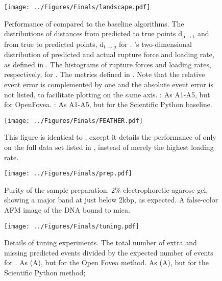 \begin{figure}[htpb]
\caption[Algorithm Performance]{\noindent{}\pStartF Performance of \name{} compared to the baseline algorithms.  The distributions of distances from predicted to true points d$_{\mathrm{p}\rightarrow\mathrm{t}}$ and from true to predicted points, d$_{\mathrm{t}\rightarrow\mathrm{p}}$ for \name{}.  \name{}'s two-dimensional distribution of predicted and actual rupture force and loading rate, as defined in .  The histograms of rupture forces and loading rates, respectively, for \name{}.   The metrics defined in . Note that the relative event error is complemented by one and the absolute event error is not listed, to facilitate plotting on the same axis. : As A1-A5, but for OpenFovea. : As A1-A5, but for the Scientific Python baseline. \pEndF }
\centering
\texttt{[image: ../Figures/Finals/landscape.pdf]}%
\end{figure}



\begin{figure}[htp]
\caption[Performance of \name{} on larger data set]{\noindent{}\pStartF This figure is identical to , except it details the performance of only \name{} on the full data set listed in , instead of merely the highest loading rate.  \pEndF }
\centering
\texttt{[image: ../Figures/Finals/FEATHER.pdf]}%
\end{figure}

\begin{figure}[htp]
\caption[Verification of sample purity]{\noindent{}\pStartF Purity of the sample preparation.  2\% electrophoretic agarose gel, showing a major band at just below 2kbp, as expected.  A false-color AFM image of the DNA bound to mica. \pEndF }
\centering
\texttt{[image: ../Figures/Finals/prep.pdf]}%
\end{figure}


\begin{figure}[htp]
\caption[Cross validation of algorithms and optimal parameters]{\noindent{}\pStartF Details of tuning experiments.  The total number of extra and missing predicted events divided by the expected number of events for \name{}.  As (A), but for the Open Fovea method.  As (A), but for the Scientific Python method; \pEndF }
\centering
\texttt{[image: ../Figures/Finals/tuning.pdf]}%
\end{figure}



